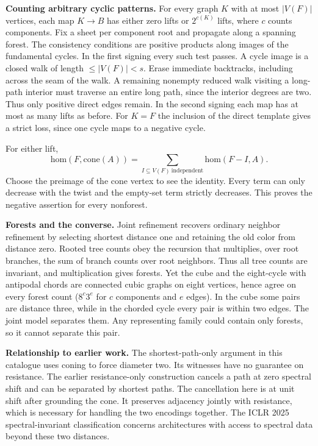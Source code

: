 \documentclass[10pt]{article}
\begin{document}
\textbf{Counting arbitrary cyclic patterns.} For every graph $K$ with at most $|V(F)|$ vertices, each map $K\to B$ has either zero lifts or $2^{c(K)}$ lifts, where $c$ counts components. Fix a sheet per component root and propagate along a spanning forest. The consistency conditions are positive products along images of the fundamental cycles. In the first signing every such test passes. A cycle image is a closed walk of length $\le |V(F)|<s$. Erase immediate backtracks, including across the seam of the walk. A remaining nonempty reduced walk visiting a long-path interior must traverse an entire long path, since the interior degrees are two. Thus only positive direct edges remain. In the second signing each map has at most as many lifts as before. For $K=F$ the inclusion of the direct template gives a strict loss, since one cycle maps to a negative cycle.

For either lift,
\[
 \mathrm{hom}(F,\mathrm{cone}(A))=
 \sum_{I\subseteq V(F)\ \mathrm{independent}}\mathrm{hom}(F-I,A).
\]
Choose the preimage of the cone vertex to see the identity. Every term can only decrease with the twist and the empty-set term strictly decreases. This proves the negative assertion for every nonforest.

\textbf{Forests and the converse.} Joint refinement recovers ordinary neighbor refinement by selecting shortest distance one and retaining the old color from distance zero. Rooted tree counts obey the recursion that multiplies, over root branches, the sum of branch counts over root neighbors. Thus all tree counts are invariant, and multiplication gives forests. Yet the cube and the eight-cycle with antipodal chords are connected cubic graphs on eight vertices, hence agree on every forest count ($8^{c}3^{e}$ for $c$ components and $e$ edges). In the cube some pairs are distance three, while in the chorded cycle every pair is within two edges. The joint model separates them. Any representing family could contain only forests, so it cannot separate this pair.

\textbf{Relationship to earlier work.} The shortest-path-only argument in this catalogue uses coning to force diameter two. Its witnesses have no guarantee on resistance. The earlier resistance-only construction cancels a path at zero spectral shift and can be separated by shortest paths. The cancellation here is at unit shift after grounding the cone. It preserves adjacency jointly with resistance, which is necessary for handling the two encodings together. The ICLR 2025 spectral-invariant classification concerns architectures with access to spectral data beyond these two distances.
\end{document}
